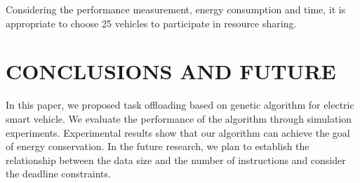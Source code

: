 \documentclass[conference]{IEEEtran}
\begin{document}

Considering the performance measurement, energy consumption and time, it is appropriate to choose 25 vehicles to participate in resource sharing. 
\section{CONCLUSIONS AND FUTURE}
In this paper, we proposed task offloading based on genetic algorithm for electric smart vehicle. We evaluate the performance of the algorithm through simulation experiments. 
Experimental results show that our algorithm can achieve the goal of energy conservation. 
In the future research, we plan to establish the relationship between the data size and the number of instructions and consider the deadline constraints.





%

\printbibliography
\end{document}
